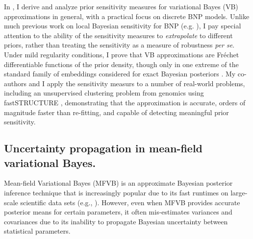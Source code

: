 In \citet{giordano:2021:bnpsensitivity}, I derive and analyze prior sensitivity
measures for variational Bayes (VB) approximations in general, with a practical
focus on discrete BNP models. Unlike much previous work on local Bayesian
sensitivity for BNP (e.g. \citet{Basu:2000:BNP_robustness}), I pay special
attention to the ability of the sensitivity measures to \emph{extrapolate} to
different priors, rather than treating the sensitivity as a measure of
robustness \textit{per se}. Under mild regularity conditions, I prove that VB
approximations are Fr{\'e}chet differentiable functions of the prior density,
though only in one extreme of the standard family of embeddings considered for
exact Bayesian posteriors \citep{gustafson:1996:localposterior}.
My co-authors and I apply the sensitivity measurs to a number of real-world
problems, including an unsupervised clustering problem from genomics using
fastSTRUCTURE \citep{raj:2014:faststructure}, demonstrating that the
approximation is accurate, orders of magnitude faster than re-fitting, and
capable of detecting meaningful prior sensitivity.

\subsection*{Uncertainty propagation in mean-field variational Bayes.}

Mean-field Variational Bayes (MFVB) is an approximate Bayesian posterior
inference technique that is increasingly popular due to its fast runtimes on
large-scale scientific data sets (e.g., \citet{raj:2014:faststructure,
kucukelbir:2017:advi, regier:2019:cataloging}). However, even when MFVB provides
accurate posterior means for certain parameters, it often mis-estimates
variances and covariances \citep{wang:2005:inadequacy, turner:2011:two} due to
its inability to propagate Bayesian uncertainty between statistical parameters.

